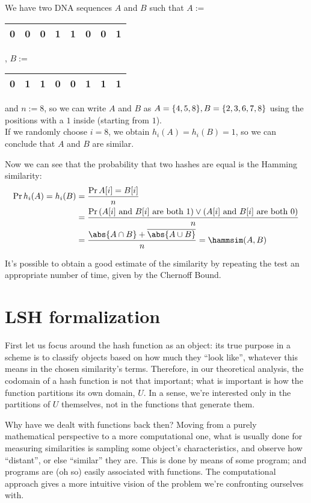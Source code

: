\begin{ex}
	We have two DNA sequences $A$ and $B$ such that $A:=$
	\begin{tabular}{|c|c|c|c|c|c|c|c|}
		\hline
		0 & 0 & 0 & 1 & 1 & 0 & 0 & 1 \\
		\hline
	\end{tabular},
	$B:=$
	\begin{tabular}{|c|c|c|c|c|c|c|c|}
		\hline
		0 & 1 & 1 & 0 & 0 & 1 & 1 & 1 \\
		\hline
	\end{tabular} and $n:=8$, so we can write $A$ and $B$ as $A=\{4,5,8\},\\ B=\{2,3,6,7,8\}$ using the positions with a $1$ inside (starting from $1$).\\
	If we randomly choose $i=8$, we obtain $h_i(A)=h_i(B)=1$, so we can conclude that $A$ and $B$ are similar.
\end{ex}


Now we can see that the probability that two hashes are equal is the Hamming similarity:
\begin{align*}
	\Pr{h_i(A)=h_i(B)} &= \frac{\Pr{A[i]=B[i]}}{n} \\
	&= \frac{\Pr{(A[i] \text{ and } B[i] \text{ are both } 1) \vee (A[i] \text{ and } B[i] \text{ are both } 0 )}}{n} \\
	&= \frac{\abs{A \cap B} + \overline{\abs{A \cup B}}}{n} = \hammsim(A,B)
\end{align*}

It's possible to obtain a good estimate of the similarity by repeating the test an appropriate number of time, given by the Chernoff Bound.

\section{LSH formalization}

First let us focus around the hash function as an object: its true purpose in a scheme is to classify objects based on how much they ``look like'', whatever this means in the chosen similarity's terms. Therefore, in our theoretical analysis, the codomain of a hash function is not that important; what is important is how the function partitions its own domain, $U$. In a sense, we're interested only in the partitions of $U$ themselves, not in the functions that generate them.

Why have we dealt with functions back then? Moving from a purely mathematical perspective to a more computational one, what is usually done for measuring similarities is sampling some object's characteristics, and observe how ``distant'', or else ``similar'' they are. This is done by means of some program; and programs are (oh so) easily associated with functions. The computational approach gives a more intuitive vision of the problem we're confronting ourselves with.


